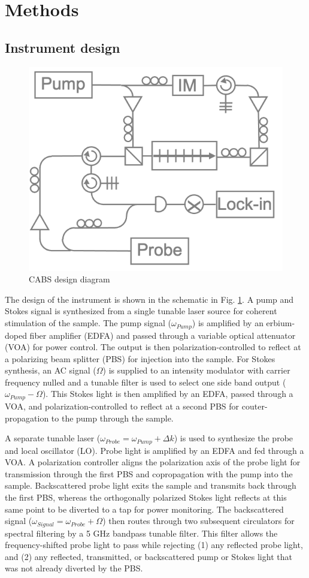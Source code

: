 \documentclass[%
  reprint,
  superscriptaddress,
  amsmath,amssymb,
  aps,
  prapplied,
]{revtex4-2}
\begin{document}
\lipsum[1-3]


\section{Methods}\label{Methods}
\subsection*{Instrument design}\label{Methods:Instrument Design}

\begin{figure}[t]
\centering
\includegraphics[width=.45\textwidth]{CABS.png}
\caption{CABS design diagram}\label{fig:CABS}
\end{figure}

The design of the instrument is shown in the schematic in Fig. \ref{fig:CABS}. A pump and Stokes signal is synthesized from a single tunable laser source for coherent stimulation of the sample. The pump signal ($\omega_{Pump}$) is amplified by an erbium-doped fiber amplifier (EDFA) and passed through a variable optical attenuator (VOA) for power control. The output is then polarization-controlled to reflect at a polarizing beam splitter (PBS) for injection into the sample. For Stokes synthesis, an AC signal ($\Omega$) is supplied to an intensity modulator with carrier frequency nulled and a tunable filter is used to select one side band output ($\omega_{Pump} - \Omega$). This Stokes light is then amplified by an EDFA, passed through a VOA, and polarization-controlled to reflect at a second PBS for couter-propagation to the pump through the sample.

A separate tunable laser ($\omega_{Probe} = \omega_{Pump} + \Delta k$) is used to synthesize the probe and local oscillator (LO). Probe light is amplified by an EDFA and fed through a VOA. A polarization controller aligns the polarization axis of the probe light for transmission through the first PBS and copropagation with the pump into the sample. Backscattered probe light exits the sample and transmits back through the first PBS, whereas the orthogonally polarized Stokes light reflects at this same point to be diverted to a tap for power monitoring. The backscattered signal ($\omega_{Signal} = \omega_{Probe} + \Omega$) then routes through two subsequent circulators for spectral filtering by a 5 GHz bandpass tunable filter. This filter allows the frequency-shifted probe light to pass while rejecting (1) any reflected probe light, and (2) any reflected, transmitted, or backscattered pump or Stokes light that was not already diverted by the PBS.
\end{document}
